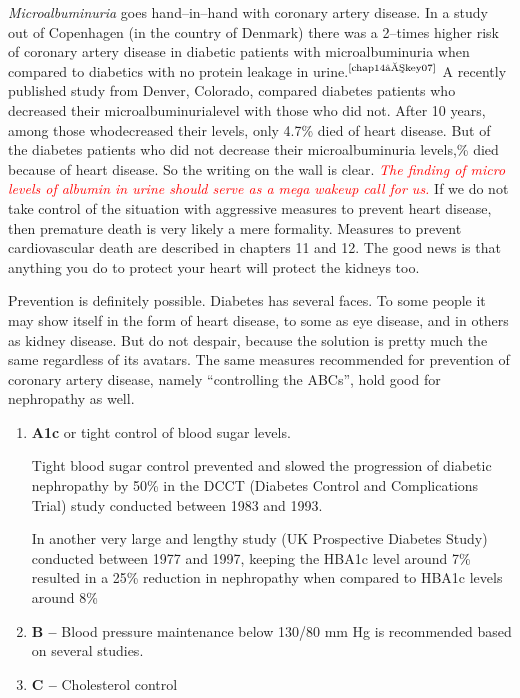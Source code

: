 \textit{Microalbuminuria} goes hand–in–hand with coronary artery disease. In a study out of Copenhagen (in the country of Denmark) there was a 2–times higher risk of coronary artery disease in diabetic patients with microalbuminuria when compared to diabetics with no protein lea\-kage in urine.$^{\text{\cite{chap14–key07}}}$ A recently published study from Denver, Colorado, compared diabetes patients who decreased their microalbuminuria\break level with those who did not. After 10 years, among those who\break decreased their levels, only 4.7\% died of heart disease. But of the dia\-betes patients who did not decrease their microalbuminuria levels,\% died because of heart disease. So the writing on the wall is clear. \textcolor{red}{\textit{The finding of micro levels of albumin in urine should serve as a mega wakeup call for us.}} If we do not take control of the situation with aggressive measures to prevent heart disease, then premature death is very likely a mere formality. Measures to prevent cardiovascular death are des\-cribed in chapters 11 and 12. The good news is that anything you do to protect your heart will protect the kidneys too.


Prevention is definitely possible. Diabetes has several faces. To some people it may show itself in the form of heart disease, to some as eye disease, and in others as kidney disease. But do not despair, because the solution is pretty much the same regardless of its avatars. The same measures recommended for prevention of coronary artery disease, namely “controlling the ABCs”, hold good for nephropathy as well.


\begin{enumerate}[\ding{118}]
\itemsep=0pt
\item \textbf{A1c} or tight control of blood sugar levels.

Tight blood sugar control prevented and slowed the progression of diabetic nephropathy by 50\% in the DCCT (Diabetes Control and Complications Trial) study conducted between 1983 and 1993.

In another very large and lengthy study (UK Prospective Diabetes Study) conducted between 1977 and 1997, keeping the HBA1c level around 7\% resulted in a 25\% reduction in nephropathy when compared to HBA1c levels around 8\%
\item \textbf{B –} Blood pressure maintenance below 130/80 mm Hg is recomme\-nded based on several studies.
\item \textbf{C –} Cholesterol control
\end{enumerate}

